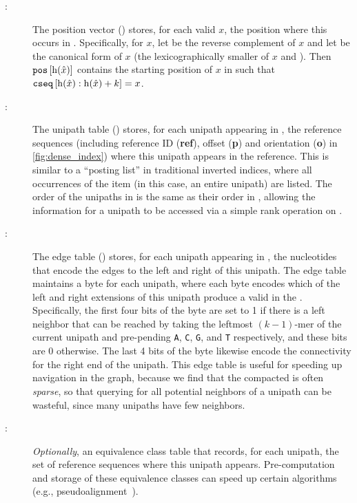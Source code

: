 \begin{description}
    \item[\pos :] The position vector (\pos) stores, for each valid \kmer $x$, the
    position where this \kmer occurs in \cseq. Specifically, for \kmer $x$, let
     be the reverse complement of $x$ and let  be the canonical
    form of $x$ (the lexicographically smaller of $x$ and ). Then
    $\texttt{pos}\left[\operatorname{h}(\hat{x})\right]$ contains the starting position of $x$ in
    \cseq such that $\texttt{cseq}\left[\operatorname{h}(\hat{x}):\operatorname{h}(\hat{x}) + k\right] = x$.

    \item[\ctab :] The unipath table (\ctab) stores, for each unipath appearing in \cseq, the
    reference sequences (including reference ID ({\bf ref}), offset ({\bf p}) and
    orientation ({\bf o}) in \cref{fig:dense_index}) where
    this unipath appears in the reference. This is similar to a ``posting list''
    in traditional inverted indices, where all occurrences of the item (in this
    case, an entire \ccdbg unipath) are listed. The order of the unipaths in \ctab
    is the same as their order in \cseq, allowing the information for a unipath to
    be accessed via a simple rank operation on \bv.

    \item[\etab :] The edge table (\etab) stores, for each unipath appearing in \cseq,
    the nucleotides that encode the edges to the left and right of this unipath.
    The edge table maintains a byte for each unipath, where each byte encodes which
    of the left and right extensions of this unipath produce a valid \kmer in the \dbg.
    Specifically, the first four bits of the byte are set to 1 if there is a left
    neighbor that can be reached by taking the leftmost $(k-1)$-mer of the current
    unipath and pre-pending \texttt{A}, \texttt{C}, \texttt{G}, and \texttt{T}
    respectively, and these bits are 0 otherwise. The last 4 bits of the byte
    likewise encode the connectivity for the right end of the unipath. This edge
    table is useful for speeding up navigation in the graph, because we find that
    the compacted \dbg is often \emph{sparse}, so that querying for all potential
    neighbors of a unipath can be wasteful, since many unipaths have few
    neighbors.%

    \label{items:dense5}

    \item[\eqtab :] \emph{Optionally}, an equivalence class table that records, for each
    unipath, the set of reference sequences where this unipath appears.
    Pre-computation and storage of these equivalence classes can speed up
    certain algorithms (e.g., pseudoalignment~\citep{Bray2016Kallisto}).
  \end{description}

